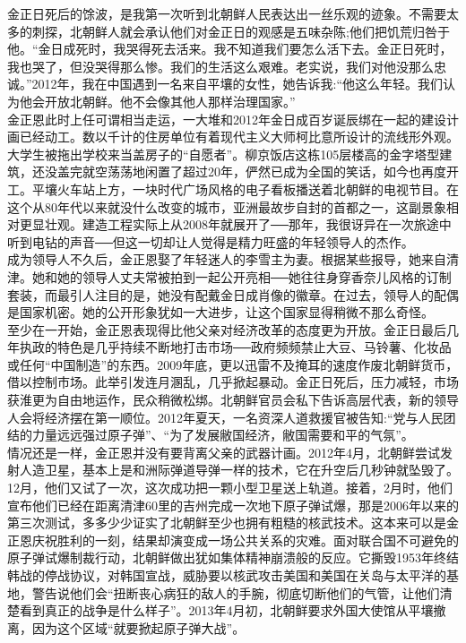 金正日死后的馀波，是我第一次听到北朝鲜人民表达出一丝乐观的迹象。不需要太多的刺探，北朝鲜人就会承认他们对金正日的观感是五味杂陈;他们把饥荒归咎于他。“金日成死时，我哭得死去活来。我不知道我们要怎么活下去。金正日死时，我也哭了，但没哭得那么惨。我们的生活这么艰难。老实说，我们对他没那么忠诚。”2012年，我在中国遇到一名来自平壤的女性，她告诉我:“他这么年轻。我们认为他会开放北朝鲜。他不会像其他人那样治理国家。”\\

金正恩此时上任可谓相当走运，一大堆和2012年金日成百岁诞辰绑在一起的建设计画已经动工。数以千计的住房单位有着现代主义大师柯比意所设计的流线形外观。大学生被拖出学校来当盖房子的“自愿者”。柳京饭店这栋105层楼高的金字塔型建筑，还没盖完就空荡荡地闲置了超过20年，俨然已成为全国的笑话，如今也再度开工。平壤火车站上方，一块时代广场风格的电子看板播送着北朝鲜的电视节目。在这个从80年代以来就没什么改变的城市，亚洲最故步自封的首都之一，这副景象相对更显壮观。建造工程实际上从2008年就展开了──那年，我很讶异在一次旅途中听到电钻的声音──但这一切却让人觉得是精力旺盛的年轻领导人的杰作。\\

成为领导人不久后，金正恩娶了年轻迷人的李雪主为妻。根据某些报导，她来自清津。她和她的领导人丈夫常被拍到一起公开亮相──她往往身穿香奈儿风格的订制套装，而最引人注目的是，她没有配戴金日成肖像的徽章。在过去，领导人的配偶是国家机密。她的公开形象犹如一大进步，让这个国家显得稍微不那么奇怪。\\

至少在一开始，金正恩表现得比他父亲对经济改革的态度更为开放。金正日最后几年执政的特色是几乎持续不断地打击市场──政府频频禁止大豆、马铃薯、化妆品或任何“中国制造”的东西。2009年底，更以迅雷不及掩耳的速度作废北朝鲜货币，借以控制市场。此举引发连月溷乱，几乎掀起暴动。金正日死后，压力减轻，市场获淮更为自由地运作，民众稍微松绑。北朝鲜官员会私下告诉高层代表，新的领导人会将经济摆在第一顺位。2012年夏天，一名资深人道救援官被告知:“党与人民团结的力量远远强过原子弹”、“为了发展敝国经济，敝国需要和平的气氛”。\\

情况还是一样，金正恩并没有要背离父亲的武器计画。2012年4月，北朝鲜尝试发射人造卫星，基本上是和洲际弹道导弹一样的技术，它在升空后几秒钟就坠毁了。12月，他们又试了一次，这次成功把一颗小型卫星送上轨道。接着，2月时，他们宣布他们已经在距离清津60里的吉州完成一次地下原子弹试爆，那是2006年以来的第三次测试，多多少少证实了北朝鲜至少也拥有粗糙的核武技术。这本来可以是金正恩庆祝胜利的一刻，结果却演变成一场公共关系的灾难。面对联合国不可避免的原子弹试爆制裁行动，北朝鲜做出犹如集体精神崩溃般的反应。它撕毁1953年终结韩战的停战协议，对韩国宣战，威胁要以核武攻击美国和美国在关岛与太平洋的基地，警告说他们会“扭断丧心病狂的敌人的手腕，彻底切断他们的气管，让他们清楚看到真正的战争是什么样子”。2013年4月初，北朝鲜要求外国大使馆从平壤撤离，因为这个区域“就要掀起原子弹大战”。\\

